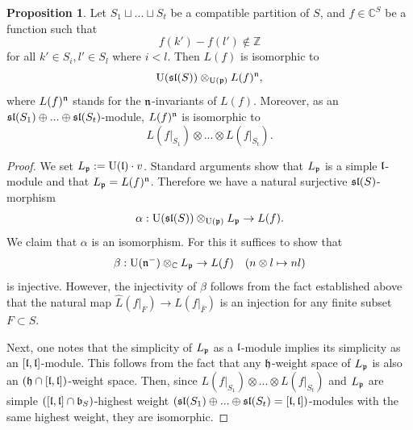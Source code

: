 \documentclass[10pt]{amsart}\oddsidemargin -1mm \evensidemargin -1mm \topmargin -15mm\headheight5mm \headsep 3.5mm \textheight 245mm\textwidth 170mm %
\theoremstyle{definition}\newtheorem{theorem}{Theorem}[section]\newtheorem{lemma}[theorem]{Lemma}\newtheorem{remark}[theorem]{Remark}\newtheorem{proposition}[theorem]{Proposition}\newtheorem{corollary}[theorem]{Corollary}\newtheorem{definition}[theorem]{Definition}\newtheorem{Ex}[theorem]{Example}
\begin{document}
\begin{proposition}\label{Lpind}Let $S_1\sqcup...\sqcup S_t$ be a compatible partition of $S$, and $f\in\mathbb C^S$ be a function such that
$$f(k')-f(l')\notin \mathbb Z$$for all  $k'\in S_i, l'\in S_l$ where $i<l$. Then $L(f)$ is isomorphic to $$\operatorname{\mathrm{U}}(\frak{sl}(S))\otimes_{\operatorname{\mathrm{U}}(\frak p)}L(f)^{\frak n},$$ where $L(f)^{\frak n}$ stands for the $\frak n$-invariants of $L(f)$. Moreover, as an $\frak{sl}(S_1)\oplus...\oplus\frak{sl}(S_t)$-module, $L(f)^{\frak n}$ is isomorphic to
$$L(f|_{S_1})\otimes...\otimes L(f|_{S_t}).$$\end{proposition}
\begin{proof}We set $L_\frak p:=\operatorname{\mathrm{U}}(\frak l)\cdot v$. Standard arguments show that $L_\frak p$ is a simple $\frak l$-module and that $L_\frak p=L(f)^{\frak n}$. Therefore we have a natural surjective $\frak{sl}(S)$-morphism
$$\alpha: \operatorname{\mathrm{U}}(\frak{sl}(S))\otimes_{\operatorname{\mathrm{U}}(\frak p)}L_\frak p\to L(f).$$
We claim that $\alpha$ is an isomorphism. For this it suffices to show that
$$\beta: \operatorname{\mathrm{U}}(\frak n^-)\otimes_{\mathbb C}L_\frak p\to L(f)\hspace{10pt}(n\otimes l\mapsto nl)$$is injective. However, the injectivity of $\beta$ follows from the fact established above that the natural map $\widehat L(f|_F)\to L(f|_{\bar F})$ is an injection for any finite subset $F\subset S$.

Next, one notes that the simplicity of $L_\frak p$ as a $\frak l$-module implies its simplicity as an $[\frak l, \frak l]$-module. This follows from the fact that any $\frak h$-weight space of $L_\frak p$ is also an $(\frak h\cap[\frak l, \frak l])$-weight space. Then, since
$L(f|_{S_1})\otimes...\otimes L(f|_{S_t})$ and $L_\frak p$ are simple $([\frak l, \frak l]\cap \frak b_S)$-highest weight $(\frak{sl}(S_1)\oplus...\oplus\frak{sl}(S_t)=[\frak l, \frak l])$-modules with the same highest weight, they are isomorphic.
\end{proof}
\end{document}

